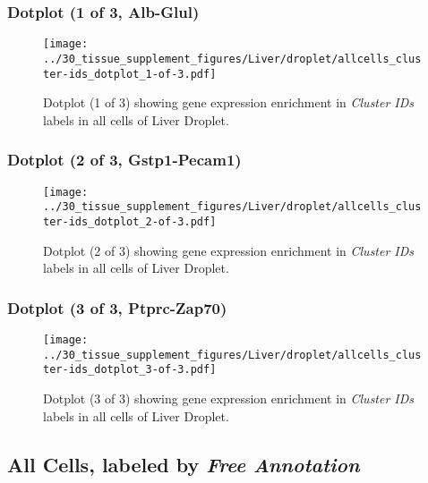 \clearpage

\subsubsection{Dotplot (1 of 3, Alb-Glul)}
\begin{figure}[h]
\centering
\texttt{[image: ../30\_tissue\_supplement\_figures/Liver/droplet/allcells\_cluster-ids\_dotplot\_1-of-3.pdf]}

\caption{ Dotplot (1 of 3)  showing gene expression enrichment in \emph{Cluster IDs} labels in all cells of Liver Droplet. }
\end{figure}


\clearpage

\subsubsection{Dotplot (2 of 3, Gstp1-Pecam1)}
\begin{figure}[h]
\centering
\texttt{[image: ../30\_tissue\_supplement\_figures/Liver/droplet/allcells\_cluster-ids\_dotplot\_2-of-3.pdf]}

\caption{ Dotplot (2 of 3)  showing gene expression enrichment in \emph{Cluster IDs} labels in all cells of Liver Droplet. }
\end{figure}


\clearpage

\subsubsection{Dotplot (3 of 3, Ptprc-Zap70)}
\begin{figure}[h]
\centering
\texttt{[image: ../30\_tissue\_supplement\_figures/Liver/droplet/allcells\_cluster-ids\_dotplot\_3-of-3.pdf]}

\caption{ Dotplot (3 of 3)  showing gene expression enrichment in \emph{Cluster IDs} labels in all cells of Liver Droplet. }
\end{figure}


\clearpage

\subsection{All Cells, labeled by \emph{Free Annotation}}
